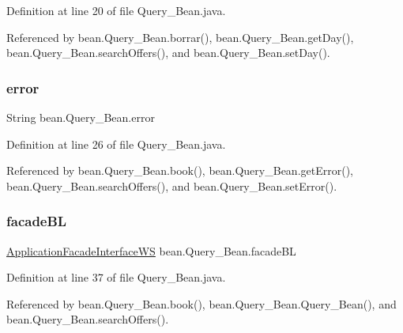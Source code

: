 Definition at line 20 of file Query\+\_\+\+Bean.\+java.



Referenced by bean.\+Query\+\_\+\+Bean.\+borrar(), bean.\+Query\+\_\+\+Bean.\+get\+Day(), bean.\+Query\+\_\+\+Bean.\+search\+Offers(), and bean.\+Query\+\_\+\+Bean.\+set\+Day().

\mbox{\label{classbean_1_1Query__Bean_a41a8d631f015a0b8df5a9b40f5cc3231}} 
\subsubsection{\texorpdfstring{error}{error}}
{\footnotesize\ttfamily String bean.\+Query\+\_\+\+Bean.\+error\hspace{0.3cm}{\ttfamily [package]}}



Definition at line 26 of file Query\+\_\+\+Bean.\+java.



Referenced by bean.\+Query\+\_\+\+Bean.\+book(), bean.\+Query\+\_\+\+Bean.\+get\+Error(), bean.\+Query\+\_\+\+Bean.\+search\+Offers(), and bean.\+Query\+\_\+\+Bean.\+set\+Error().

\mbox{\label{classbean_1_1Query__Bean_a8809176658727a8daec87ba0b2dda2de}} 
\subsubsection{\texorpdfstring{facadeBL}{facadeBL}}
{\footnotesize\ttfamily \mbox{\hyperlink{interfacebusinessLogic_1_1ApplicationFacadeInterfaceWS}{Application\+Facade\+Interface\+WS}} bean.\+Query\+\_\+\+Bean.\+facade\+BL\hspace{0.3cm}{\ttfamily [static]}}



Definition at line 37 of file Query\+\_\+\+Bean.\+java.



Referenced by bean.\+Query\+\_\+\+Bean.\+book(), bean.\+Query\+\_\+\+Bean.\+Query\+\_\+\+Bean(), and bean.\+Query\+\_\+\+Bean.\+search\+Offers().

\mbox{\label{classbean_1_1Query__Bean_af1040de2275895452b9e60535b4983b6}} 
